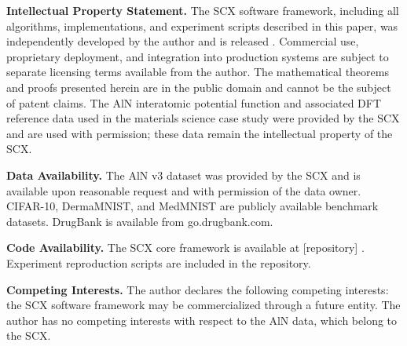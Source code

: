 \documentclass[11pt,twocolumn]{article}
\begin{document}
\textbf{Intellectual Property Statement.}
The SCX software framework, including all algorithms, implementations, and experiment scripts described in this paper, was independently developed by the author and is released . Commercial use, proprietary deployment, and integration into production systems are subject to separate licensing terms available from the author. The mathematical theorems and proofs presented herein are in the public domain and cannot be the subject of patent claims. The AlN interatomic potential function and associated DFT reference data used in the materials science case study were provided by the SCX and are used with permission; these data remain the intellectual property of the SCX.

\textbf{Data Availability.}
The AlN v3 dataset was provided by the SCX and is available upon reasonable request and with permission of the data owner. CIFAR-10, DermaMNIST, and MedMNIST are publicly available benchmark datasets. DrugBank is available from go.drugbank.com.

\textbf{Code Availability.}
The SCX core framework is available at [repository] . Experiment reproduction scripts are included in the repository.

\textbf{Competing Interests.}
The author declares the following competing interests: the SCX software framework may be commercialized through a future entity. The author has no competing interests with respect to the AlN data, which belong to the SCX.
\end{document}
